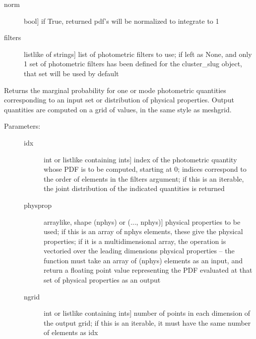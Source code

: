 \documentclass[letterpaper,10pt,english]{sphinxmanual}
\begin{document}
\begin{fulllineitems}
\begin{fulllineitems}
\begin{description}
\begin{description}
\item[{norm}] \leavevmode{[}bool{]}
if True, returned pdf's will be normalized to integrate
to 1

\item[{filters}] \leavevmode{[}listlike of strings{]}
list of photometric filters to use; if left as None, and
only 1 set of photometric filters has been defined for
the cluster\_slug object, that set will be used by
default

\end{description}

\end{description}

\end{fulllineitems}


\begin{fulllineitems}
\label{cluster_slug:slugpy.cluster_slug.cluster_slug.mpdf_phot}
Returns the marginal probability for one or mode photometric
quantities corresponding to an input set or distribution of
physical properties. Output quantities are computed on a grid of
values, in the same style as meshgrid.
\begin{description}
\item[{Parameters:}] \leavevmode\begin{description}
\item[{idx}] \leavevmode{[}int or listlike containing ints{]}
index of the photometric quantity whose PDF is to be
computed, starting at 0; indices correspond to the order
of elements in the filters argument; if this is an
iterable, the joint distribution of the indicated
quantities is returned

\item[{physprop}] \leavevmode{[}arraylike, shape (nphys) or (..., nphys){]}
physical properties to be used; if this is an array of
nphys elements, these give the physical properties; if
it is a multidimensional array, the operation is
vectoried over the leading dimensions
physical properties -- the function must take an array
of (nphys) elements as an input, and return a floating
point value representing the PDF evaluated at that set
of physical properties as an output

\item[{ngrid}] \leavevmode{[}int or listlike containing ints{]}
number of points in each dimension of the output grid;
if this is an iterable, it must have the same number of
elements as idx


\end{description}
\end{description}
\end{fulllineitems}
\end{fulllineitems}
\end{document}
